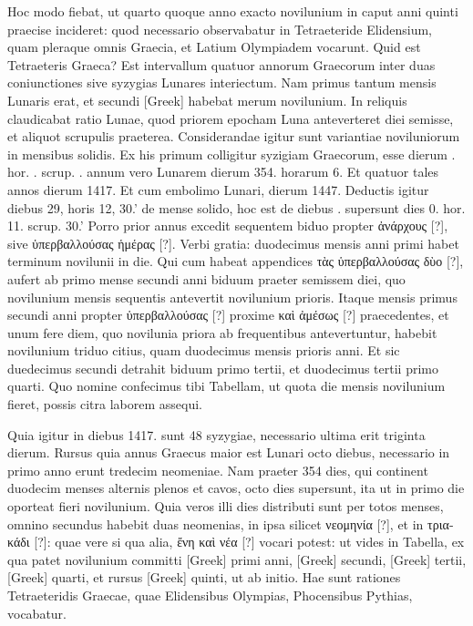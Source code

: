 Hoc modo fiebat, ut quarto quoque anno exacto novilunium
in caput anni quinti praecise incideret: quod necessario observabatur
in Tetraeteride Elidensium, quam pleraque omnis Graecia,
et Latium Olympiadem vocarunt.
Quid est Tetraeteris Graeca?
Est
intervallum quatuor annorum Graecorum inter duas coniunctiones sive
syzygias Lunares interiectum.
Nam primus tantum mensis Lunaris
erat, et secundi \textgreek{[Greek]} habebat merum novilunium.
In reliquis
claudicabat ratio Lunae, quod priorem epocham Luna anteverteret
diei semisse, et aliquot scrupulis praeterea.
Considerandae igitur sunt
variantiae noviluniorum in mensibus solidis.
Ex his primum colligitur
syzigiam Graecorum, esse dierum .
 hor. . scrup. . annum
vero Lunarem dierum 354. horarum 6.
Et quatuor tales annos dierum
1417.
Et cum embolimo Lunari, dierum 1447.
Deductis igitur
diebus 29, horis 12, 30.' de mense solido, hoc est de diebus .
supersunt dies 0. hor. 11. scrup. 30.'
Porro prior annus excedit sequentem
biduo propter \textgreek{ἀνάρχους [?]},
 sive \textgreek{ὑπερβαλλούσας ἡμέρας [?]}.
Verbi gratia:
duodecimus mensis anni primi habet terminum novilunii in 
die.
Qui cum habeat appendices \textgreek{τὰς ὑπερβαλλούσας δὺο [?]},
 aufert ab primo
mense secundi anni biduum praeter semissem diei, quo novilunium
mensis sequentis antevertit novilunium prioris.
Itaque mensis primus
secundi anni propter \textgreek{ὑπερβαλλούσας [?]} proxime
 \textgreek{καὶ ἀμέσως [?]} praecedentes, et unum
fere diem, quo novilunia priora ab frequentibus antevertuntur, habebit
novilunium triduo citius, quam duodecimus mensis prioris anni.
Et sic duedecimus secundi detrahit biduum primo tertii, et duodecimus
tertii primo quarti.
Quo nomine confecimus tibi Tabellam, ut
quota die mensis novilunium fieret, possis citra laborem assequi.
\begin{table}[htbp]
  
\end{table}

Quia
igitur in diebus 1417. sunt 48 syzygiae, necessario
ultima erit triginta dierum.
Rursus quia annus
Graecus maior est Lunari octo diebus, necessario
in primo anno erunt tredecim neomeniae.
Nam
praeter 354 dies, qui continent duodecim menses
alternis plenos et cavos, octo dies supersunt, ita ut
in primo die oporteat fieri novilunium.
Quia veros
illi dies distributi sunt per totos menses, omnino
secundus habebit duas neomenias, in ipsa silicet
\textgreek{νεομηνία [?]}, et in \textgreek{τριακάδι [?]}: quae vere si qua alia,
\textgreek{ἔνη καὶ νέα [?]} vocari potest: ut vides in Tabella, ex qua
patet novilunium committi \textgreek{[Greek]} primi
anni, \textgreek{[Greek]} secundi, \textgreek{[Greek]}
tertii, \textgreek{[Greek]} quarti, et rursus \textgreek{[Greek]}
quinti, ut ab initio.
Hae sunt rationes Tetraeteridis Graecae,
quae Elidensibus Olympias, Phocensibus Pythias, vocabatur.

